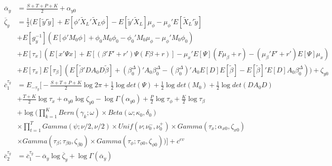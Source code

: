 \documentclass[11pt]{article}
\begin{document}
\begin{align*}
\begin{split}
	\overline{\alpha}_{y}	&=	\frac{S+T+P+K}{2}+\alpha_{y0}\\
	\overline{\zeta}_{y}	&=	\frac{1}{2}\Bigg(E\left[\tilde{y}'\tilde{y}\right]+E\left[\phi'\tilde{X}_{L}'\tilde{X}_{L}\phi\right]-E\left[\tilde{y}'\tilde{X}_{L}\right]\mu_{\phi}-\mu_{\phi}'E\left[\tilde{X}_{L}'\tilde{y}\right]\\
					&+E\left[g_{y}^{-1}\right]\left(E\left[\phi'M_{0}\phi\right]+\phi_{0}M_{0}\phi_{0}-\phi_{0}'M_{0}\mu_{\phi}-\mu_{\phi}'M_{0}\phi_{0}\right)\\
					&+E\left[\tau_{x}\right]\left(E\left[x'\Psi x\right]+E\left[\left(\beta'F'+r'\right)\Psi\left(F\beta+r\right)\right]-\mu_{x}'E\left[\Psi\right]\left(F\mu_{\beta}+r\right)-\left(\mu_{\beta}'F'+r'\right)E\left[\Psi\right]\mu_{x}\right)\\
					&+E\left[\tau_{x}\right]E\left[\tau_{\beta}\right]\left(E\left[\tilde{\beta}'DA_{0}D\tilde{\beta}\right]+\left(\beta_{0}^{\Delta}\right)'A_{0}\beta_{0}^{\Delta}-\left(\beta_{0}^{\Delta}\right)'A_{0}E\left[D\right]E\left[\tilde{\beta}\right]-E\left[\tilde{\beta}\right]'E\left[D\right]A_{0}\beta_{0}^{\Delta}\right)\Bigg)+\zeta_{y0}\\
	\overline{c}_{1}^{\tau_{y}}
					&=E_{-\tau_{y}}\Bigg[-\frac{S+T+P+K}{2}\log2\pi+\frac{1}{2}\log det\left(\Psi\right)+\frac{1}{2}\log det\left(M_{0}\right)+\frac{1}{2}\log det\left(DA_{0}D\right)\\
					&+\frac{T+K}{2}\log\tau_{x}+\alpha_{y0}\log\zeta_{y0}-\log\Gamma\left(\alpha_{y0}\right)+\frac{P}{2}\log\tau_{\phi}+\frac{K}{2}\log\tau_{\beta}\\
					&+\log\Bigg(\prod_{k=1}^{K}Bern\left(\gamma_{k};\omega\right)\times Beta\left(\omega;\kappa_{0},\delta_{0}\right)\\
					&\times\prod_{t=1}^{T}Gamma\left(\psi;\nu/2,\nu/2\right)\times Unif\left(\nu;\nu_{0}^{-},\nu_{0}^{+}\right)\times Gamma\left(\tau_{x};\alpha_{x0},\zeta_{x0}\right)\\
					&\times Gamma\left(\tau_{\beta};\tau_{\beta0},\zeta_{\beta0}\right)\times Gamma\left(\tau_{\phi};\tau_{\phi0},\zeta_{\phi0}\right)\Bigg)\Bigg]+c^{ev}\\
	\overline{c}_{2}^{\tau_{y}}
					&=\overline{c}_{1}^{\tau_{y}}-\overline{\alpha}_{y}\log\overline{\zeta}_{y}+\log\Gamma\left(\overline{\alpha}_{y}\right)
\end{split}
\end{align*}
\end{document}

